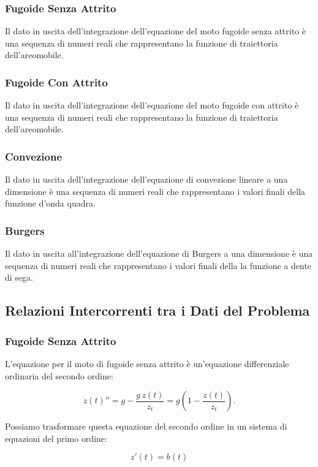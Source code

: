 \subsubsection*{Fugoide Senza Attrito}
Il dato in uscita dell'integrazione dell'equazione del moto fugoide senza attrito è una sequenza di numeri reali che rappresentano la funzione di traiettoria dell'areomobile.
\subsubsection*{Fugoide Con Attrito}
Il dato in uscita dell'integrazione dell'equazione del moto fugoide con attrito è una sequenza di numeri reali che rappresentano la funzione di traiettoria dell'areomobile.
\subsubsection*{Convezione}
Il dato in uscita dell'integrazione dell'equazione di convezione lineare a una dimensione è una sequenza di numeri reali che rappresentano i valori finali della funzione d'onda quadra.
\subsubsection*{Burgers}
Il dato in uscita all'integrazione dell'equazione di Burgers a una dimensione è una sequenza di numeri reali che rappresentano i valori finali della la funzione a dente di sega.

\subsection{Relazioni Intercorrenti tra i Dati del Problema}\label{analisi}

\subsubsection*{Fugoide Senza Attrito}
L’equazione per il moto di fugoide senza attrito è un’equazione differenziale ordinaria del secondo ordine:

\begin{equation}
z(t)'' = g - \frac{g \,z(t)}{z_t} = g \left(1 - \frac{z(t)}{z_t}\right).
\end{equation}

\noindent
Possiamo trasformare questa equazione del secondo ordine in un sistema di equazioni del primo ordine:

\begin{equation}
z'(t) = b(t)
\end{equation}

